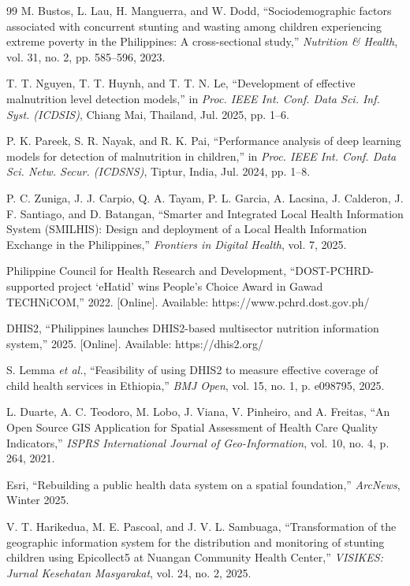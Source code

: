 \documentclass[12pt, a4paper]{report}
\begin{document}
\begin{thebibliography}{99}
M. Bustos, L. Lau, H. Manguerra, and W. Dodd, ``Sociodemographic factors associated with concurrent stunting and wasting among children experiencing extreme poverty in the Philippines: A cross-sectional study,'' \textit{Nutrition \& Health}, vol. 31, no. 2, pp. 585--596, 2023.

T. T. Nguyen, T. T. Huynh, and T. T. N. Le, ``Development of effective malnutrition level detection models,'' in \textit{Proc. IEEE Int. Conf. Data Sci. Inf. Syst. (ICDSIS)}, Chiang Mai, Thailand, Jul. 2025, pp. 1--6.

P. K. Pareek, S. R. Nayak, and R. K. Pai, ``Performance analysis of deep learning models for detection of malnutrition in children,'' in \textit{Proc. IEEE Int. Conf. Data Sci. Netw. Secur. (ICDSNS)}, Tiptur, India, Jul. 2024, pp. 1--8.

P. C. Zuniga, J. J. Carpio, Q. A. Tayam, P. L. Garcia, A. Lacsina, J. Calderon, J. F. Santiago, and D. Batangan, ``Smarter and Integrated Local Health Information System (SMILHIS): Design and deployment of a Local Health Information Exchange in the Philippines,'' \textit{Frontiers in Digital Health}, vol. 7, 2025.

Philippine Council for Health Research and Development, ``DOST-PCHRD-supported project `eHatid' wins People's Choice Award in Gawad TECHNiCOM,'' 2022. [Online]. Available: https://www.pchrd.dost.gov.ph/

DHIS2, ``Philippines launches DHIS2-based multisector nutrition information system,'' 2025. [Online]. Available: https://dhis2.org/

S. Lemma \textit{et al.}, ``Feasibility of using DHIS2 to measure effective coverage of child health services in Ethiopia,'' \textit{BMJ Open}, vol. 15, no. 1, p. e098795, 2025.

L. Duarte, A. C. Teodoro, M. Lobo, J. Viana, V. Pinheiro, and A. Freitas, ``An Open Source GIS Application for Spatial Assessment of Health Care Quality Indicators,'' \textit{ISPRS International Journal of Geo-Information}, vol. 10, no. 4, p. 264, 2021.

Esri, ``Rebuilding a public health data system on a spatial foundation,'' \textit{ArcNews}, Winter 2025.

V. T. Harikedua, M. E. Pascoal, and J. V. L. Sambuaga, ``Transformation of the geographic information system for the distribution and monitoring of stunting children using Epicollect5 at Nuangan Community Health Center,'' \textit{VISIKES: Jurnal Kesehatan Masyarakat}, vol. 24, no. 2, 2025.


\end{thebibliography}
\end{document}
